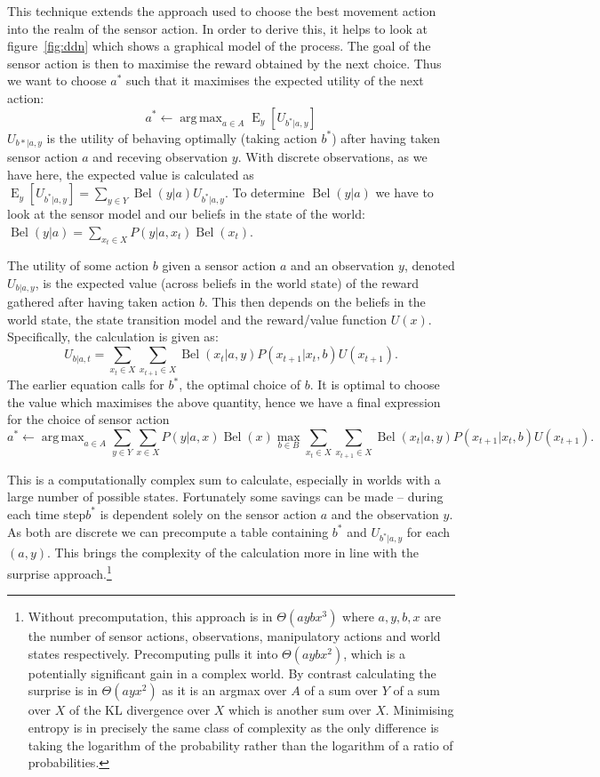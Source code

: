 \documentclass{article}
\DeclareMathOperator*{\argmax}{arg\,max}
\DeclareMathOperator{\bel}{Bel}
\DeclareMathOperator{\expected}{E}
\begin{document}
This technique extends the approach used to choose the best movement action into
the realm of the sensor action. In order to derive this, it helps to look at 
figure~\ref{fig:ddn} which shows a graphical model of the process. The goal of the 
sensor action is then to maximise the reward obtained by the next choice. Thus we want
to choose \(a^*\) such that it maximises the expected utility of the next action:
\[
	a^* \gets \argmax_{a \in A} \expected_y \left[ U_{b^* | a,y}\right]
\]
\(U_{b* | a,y}\) is the utility of behaving optimally (taking action \(b^*\)) after
having taken sensor action \(a\) and receving observation \(y\). With discrete
observations, as we have here, the expected value is calculated as 
\(
	\expected_y \left[ U_{b^* | a,y}\right] = \sum_{y \in Y} \bel(y | a) U_{b^* | a,y}.
\)
To determine \(\bel(y | a)\) we have to look at the sensor model and our beliefs in the
state of the world: \(\bel(y | a) = \sum_{x_t \in X}  P(y | a,x_t)\bel(x_t).\) 

The utility of some action \(b\) given a sensor action \(a\) and an observation \(y\),
denoted \(U_{b | a,y}\), is the expected value (across beliefs in the world state) of 
the reward gathered after having taken action \(b\). This then depends on the beliefs
in the world state, the state transition model and the reward/value function \(U(x)\).
Specifically, the calculation is given as:
\[
	U_{b | a,t} = \sum_{x_t \in X} \sum_{x_{t+1} \in X} \bel(x_t | a,y)P(x_{t+1}|x_t,b)U(x_{t+1}).
\] The earlier equation calls for \(b^*\), the optimal choice of \(b\). It is optimal to 
choose the value which maximises the above quantity, hence we have a final expression
for the choice of sensor action
\[
	a^* \gets \argmax_{a \in A} \sum_{y \in Y} \sum_{x \in X} P(y | a,x)\bel(x) \max_{b \in B} \sum_{x_t \in X}\sum_{x_{t+1} \in X} \bel(x_t | a,y)P(x_{t+1}|x_t,b)U(x_{t+1}).
\]

This is a computationally complex sum to calculate, especially in worlds with a 
large number of possible states. Fortunately some savings can be made -- during each 
time step\(b^*\) is  dependent solely on the sensor action \(a\) and the observation
 \(y\). As both are discrete we can precompute a table containing \(b^*\) and 
 \(U_{b^* | a,y}\) for each \((a,y)\). This brings the complexity of the calculation
 more in line with the surprise approach.\footnote{Without precomputation, this approach
 is in \(\Theta(aybx^3)\) where \(a,y,b,x\) are the number of sensor actions, 
 observations, manipulatory actions and world states respectively. Precomputing
 pulls it into \(\Theta(aybx^2)\), which is a potentially significant gain in a complex
 world. By contrast calculating the surprise is in \(\Theta(ayx^2)\) as it is an argmax
 over \(A\) of a sum over \(Y\) of a sum over \(X\) of the KL divergence over \(X\) which
 is another sum over \(X\). Minimising entropy is in precisely the same class of 
 complexity as the only difference is taking the logarithm of the probability rather
 than the logarithm of a ratio of probabilities.}
\end{document}
